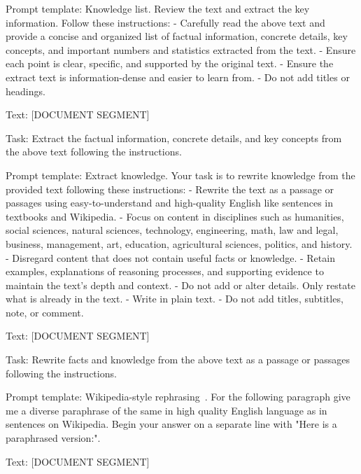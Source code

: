 \documentclass[11pt]{article}
\begin{document}
\begin{table}[!hbt]
\begin{prompt}{Prompt template: Knowledge list.}
Review the text and extract the key information. Follow these instructions:
- Carefully read the above text and provide a concise and organized list of factual information, concrete details, key concepts, and important numbers and statistics extracted from the text.
- Ensure each point is clear, specific, and supported by the original text.
- Ensure the extract text is information-dense and easier to learn from.
- Do not add titles or headings.

Text:
[DOCUMENT SEGMENT]

Task:
Extract the factual information, concrete details, and key concepts from the above text following the instructions.
\end{prompt}

\end{table}


\begin{table}[!hbt]
\begin{prompt}{Prompt template: Extract knowledge.}
Your task is to rewrite knowledge from the provided text following these instructions:
- Rewrite the text as a passage or passages using easy-to-understand and high-quality English like sentences in textbooks and Wikipedia.
- Focus on content in disciplines such as humanities, social sciences, natural sciences, technology, engineering, math, law and legal, business, management, art, education, agricultural sciences, politics, and history.
- Disregard content that does not contain useful facts or knowledge.
- Retain examples, explanations of reasoning processes, and supporting evidence to maintain the text's depth and context.
- Do not add or alter details. Only restate what is already in the text.
- Write in plain text.
- Do not add titles, subtitles, note, or comment.

Text:
[DOCUMENT SEGMENT]

Task:
Rewrite facts and knowledge from the above text as a passage or passages following the instructions.
\end{prompt}
\end{table}





\begin{table}[!hbt]
\begin{prompt}{Prompt template: Wikipedia-style rephrasing~\citep{maini2024rephrasing}.}
For the following paragraph give me a diverse paraphrase of the same in high quality English language as in sentences on Wikipedia. Begin your answer on a separate line with "Here is a paraphrased version:".

Text: [DOCUMENT SEGMENT]
\end{prompt}
\end{table}
\end{document}

